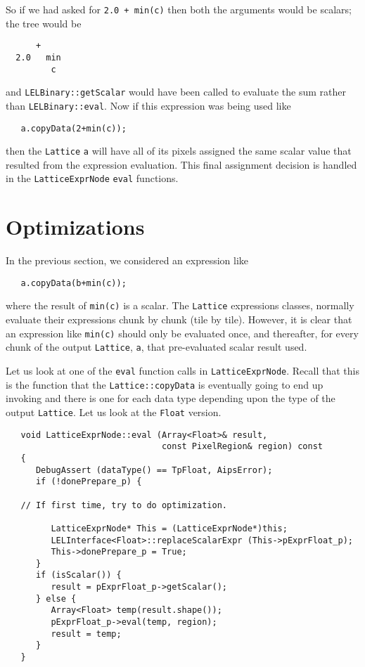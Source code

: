 So if we had asked for  {\tt 2.0 + min(c)}  then  both the arguments
would be scalars; the tree would be

\begin{verbatim}
      +
  2.0   min
         c
\end{verbatim}

and {\tt LELBinary::getScalar} would have been called to evaluate
the sum rather than {\tt LELBinary::eval}.   Now if this expression
was being used like

\begin{verbatim}
   a.copyData(2+min(c));
\end{verbatim}

then the {\tt Lattice} {\tt a} will have all of its pixels assigned the
same scalar value that resulted from the expression evaluation.
This final assignment decision is handled in the {\tt LatticeExprNode}
{\tt eval} functions.  



\section {Optimizations}

In the previous section, we considered an expression like 

\begin{verbatim}
   a.copyData(b+min(c));
\end{verbatim}

where the result of {\tt min(c)} is a scalar.  The {\tt Lattice} expressions
classes, normally evaluate their expressions chunk by chunk (tile by
tile).  However, it is clear that an expression like {\tt min(c)} should
only be evaluated once, and thereafter, for every chunk of the output
{\tt Lattice}, {\tt a}, that pre-evaluated scalar result used.

Let us look at one of the {\tt eval} function calls in {\tt LatticeExprNode}.
Recall that this is the function that the {\tt Lattice::copyData} is eventually
going to end up invoking and there is one for each data type 
depending upon the type of the output {\tt Lattice}.  Let us look at the
{\tt Float} version.

\begin{verbatim}
   void LatticeExprNode::eval (Array<Float>& result,
                               const PixelRegion& region) const
   {
      DebugAssert (dataType() == TpFloat, AipsError);
      if (!donePrepare_p) {
 
   // If first time, try to do optimization.
 
         LatticeExprNode* This = (LatticeExprNode*)this;
         LELInterface<Float>::replaceScalarExpr (This->pExprFloat_p);
         This->donePrepare_p = True;
      }
      if (isScalar()) {
         result = pExprFloat_p->getScalar();   
      } else {
         Array<Float> temp(result.shape());
         pExprFloat_p->eval(temp, region);   
         result = temp;
      }
   }
\end{verbatim}


